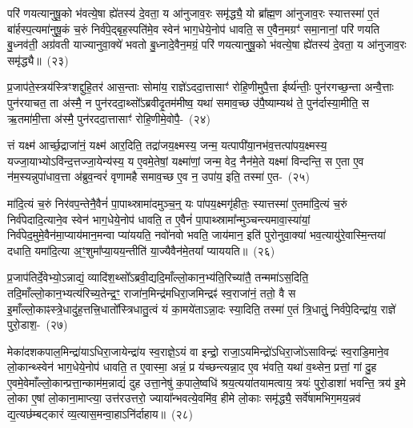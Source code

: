 परि॑ णयत्यानुषू॒को भ॑वत्ये॒षा ह्ये॑तस्य॑ दे॒वता॒ य आ॑नुजाव॒रः समृ॑द्ध्यै॒ यो ब्रा᳚ह्म॒ण आ॑नुजाव॒रः स्यात्तस्मा॑ ए॒तं बा॑र्\mbox{}हस्प॒त्यमा॑नुषू॒कं च॒रुं निर्व॑पे॒द्बृह॒स्पति॑मे॒व स्वेन॑ भाग॒धेये॒नोप॑ धावति॒ स ए॒वैन॒मग्रꣳ॑ समा॒नानां॒ परि॑ णयति बु॒ध्नव॑ती॒ अग्र॑वती याज्यानुवा॒क्ये॑ भवतो बु॒ध्नादे॒वैन॒मग्रं॒ परि॑ णयत्यानुषू॒को भ॑वत्ये॒षा ह्ये॑तस्य॑ दे॒वता॒ य आ॑नुजाव॒रः समृ॑द्ध्यै॥~(२३)

{\anuvakamend[{ए॒व निरग्र॑मे॒तस्य॑ च॒त्वारि॑ च}]}%

प्र॒जा\-प॑ते॒स्त्रय॑स्त्रिꣳशद्दुहि॒तर॑ आस॒न्ताः सोमा॑य॒ राज्ञे॑\-ऽददा॒त्तासाꣳ॑ रोहि॒णीमुपै॒त्ता ईर्ष्य॑न्तीः॒ पुन॑रगच्छ॒न्ता अन्वै॒त्ताः पुन॑रयाचत॒ ता अ॑स्मै॒ न पुन॑रददा॒थ्सो᳚\-ऽब्रवीदृ॒तम॑मीष्व॒ यथा॑ समाव॒च्छ उ॑पै॒ष्याम्यथ॑ ते॒ पुन॑र्दास्या॒मीति॒ स ऋ॒तमा॑मी॒त्ता अ॑स्मै॒ पुन॑रददा॒त्तासाꣳ॑ रोहि॒णीमे॒वोपै॒-~(२४)

त्तं यक्ष्म॑ आर्च्छ॒द्राजा॑नं॒ यक्ष्म॑ आर॒दिति॒ तद्रा॑जय॒क्ष्मस्य॒ जन्म॒ यत्पापी॑या॒नभ॑व॒त्तत्पा॑पय॒क्ष्मस्य॒ यज्जा॒याभ्यो\-ऽवि॑न्द॒त्तज्जा॒येन्य॑स्य॒ य ए॒वमे॒तेषां॒ यक्ष्मा॑णां॒ जन्म॒ वेद॒ नैन॑मे॒ते यक्ष्मा॑ विन्दन्ति॒ स ए॒ता ए॒व न॑म॒स्यन्नुपा॑धाव॒त्ता अ॑ब्रुव॒न्वरं॑ वृणामहै समाव॒च्छ ए॒व न॒ उपा॑य॒ इति॒ तस्मा॑ ए॒त-~(२५)

मा॑दि॒त्यं च॒रुं निर॑वप॒न्तेनै॒वैनं॑ पा॒पाथ्स्रामा॑दमुञ्च॒न्॒ यः पा॑पय॒क्ष्मगृ॑हीतः॒ स्यात्तस्मा॑ ए॒तमा॑दि॒त्यं च॒रुं निर्व॑पेदादि॒त्याने॒व स्वेन॑ भाग॒धेये॒नोप॑ धावति॒ त ए॒वैनं॑ पा॒पाथ्स्रामा᳚न्मुञ्चन्त्यमावा॒स्या॑यां॒ निर्व॑पेद॒मुमे॒वैन॑मा॒प्याय॑मान॒मन्वा प्या॑ययति॒ नवो॑नवो भवति॒ जाय॑\-मान॒ इति॑ पुरोनुवा॒क्या॑ भव॒त्यायु॑रे॒वास्मि॒न्तया॑ दधाति॒ यमा॑\-दि॒त्या अ॒ꣳ॒शुमा᳚प्या॒यय॒न्तीति॑ या॒ज्यैवैन॑मे॒तया᳚ प्याययति॥~(२६)

{\anuvakamend[{ए॒वोपै॒तम॑स्मि॒न्त्रयो॑दश च}]}%

प्र॒जा\-प॑तिर्दे॒वेभ्यो॒\-ऽन्नाद्यं॒ व्यादि॑श॒थ्सो᳚\-ऽब्रवी॒द्यदि॒माँल्लो॒का\-न॒भ्य॑ति॒\-रिच्या॑तै॒ तन्ममा॑\-ऽस॒दिति॒ तदि॒माँल्लो॒का\-न॒भ्यत्य॑रिच्य॒तेन्द्र॒ꣳ॒ राजा॑न॒\-मिन्द्र॑मधिरा॒जमिन्द्रꣴ॑ स्व॒राजा॑नं॒ ततो॒ वै स इ॒माँल्लो॒काꣴस्त्रे॒धा\-दु॑ह॒त्तत्त्रि॒धातो᳚स्त्रिधातु॒त्वं यं का॒मये॑ता\-ऽन्ना॒दः स्या॒दिति॒ तस्मा॑ ए॒तं त्रि॒धातुं॒ निर्व॑पे॒दिन्द्रा॑य॒ राज्ञे॑ पुरो॒डाश॒-~(२७)

मेका॑\-दश\-कपाल॒मिन्द्रा॑या\-ऽधिरा॒जायेन्द्रा॑य स्व॒राज्ञे॒\-ऽयं वा इन्द्रो॒ राजा॒\-ऽयमिन्द्रो॑\-ऽधिरा॒जो॑\-ऽसाविन्द्रः॑ स्व॒राडि॒माने॒व लो॒कान्थ्स्वेन॑ भाग॒धेये॒नोप॑ धावति॒ त ए॒वास्मा॒ अन्नं॒ प्र य॑च्छन्त्यन्ना॒द ए॒व भ॑वति॒ यथा॑ व॒थ्सेन॒ प्रत्तां॒ गां दु॒ह ए॒वमे॒वेमाँल्लो॒कान्प्रत्ता॒न्काम॑म॒न्नाद्यं॑ दुह उत्ता॒नेषु॑ क॒पाले॒ष्वधि॑ श्रय॒त्यया॑तयामत्वाय॒ त्रयः॑ पुरो॒डाशा॑ भवन्ति॒ त्रय॑ इ॒मे लो॒का ए॒षां लो॒काना॒माप्त्या॒ उत्त॑रउत्तरो॒ ज्याया᳚न्भवत्ये॒वमि॑व॒ हीमे लो॒काः समृ॑द्ध्यै॒ सर्वे॑षामभिग॒मय॒न्नव॑ द्य॒त्यछ॑म्बट्कारं व्य॒त्यास॒मन्वा॒हा\-ऽनि॑र्दाहाय॥~(२८)

